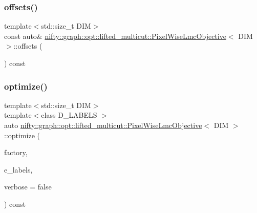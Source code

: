 \subsubsection{\texorpdfstring{offsets()}{offsets()}\hspace{0.1cm}{\footnotesize\ttfamily [2/2]}}
{\footnotesize\ttfamily template$<$std\+::size\+\_\+t D\+IM$>$ \\
const auto\& \hyperlink{classnifty_1_1graph_1_1opt_1_1lifted__multicut_1_1PixelWiseLmcObjective}{nifty\+::graph\+::opt\+::lifted\+\_\+multicut\+::\+Pixel\+Wise\+Lmc\+Objective}$<$ D\+IM $>$\+::offsets (\begin{DoxyParamCaption}{ }\end{DoxyParamCaption}) const\hspace{0.3cm}{\ttfamily [inline]}}

\mbox{\label{classnifty_1_1graph_1_1opt_1_1lifted__multicut_1_1PixelWiseLmcObjective_a5d81f386676196f07d1b44cbfaac487a}} 
\subsubsection{\texorpdfstring{optimize()}{optimize()}}
{\footnotesize\ttfamily template$<$std\+::size\+\_\+t D\+IM$>$ \\
template$<$class D\+\_\+\+L\+A\+B\+E\+LS $>$ \\
auto \hyperlink{classnifty_1_1graph_1_1opt_1_1lifted__multicut_1_1PixelWiseLmcObjective}{nifty\+::graph\+::opt\+::lifted\+\_\+multicut\+::\+Pixel\+Wise\+Lmc\+Objective}$<$ D\+IM $>$\+::optimize (\begin{DoxyParamCaption}\item[{\hyperlink{classnifty_1_1graph_1_1opt_1_1lifted__multicut_1_1PixelWiseLmcObjective_aed7d162d3b82b26428c3e484d7788fc9}{Lmc\+Factory\+Base\+Shared\+Ptr}}]{factory,  }\item[{const xt\+::xexpression$<$ D\+\_\+\+L\+A\+B\+E\+LS $>$ \&}]{e\+\_\+labels,  }\item[{const bool}]{verbose = {\ttfamily false} }\end{DoxyParamCaption}) const\hspace{0.3cm}{\ttfamily [inline]}}

